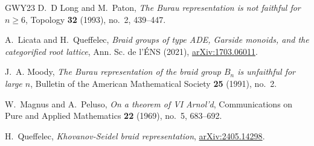 \documentclass[a4paper]{amsart}
\newcommand{\0}{\mathbf{0}}
\theoremstyle{theorem}
\begin{document}
\begin{thebibliography}{GWY23}
D.~D Long and M.~Paton, \emph{The {B}urau representation is not faithful for
  $n\geq 6$}, Topology \textbf{32} (1993), no.~2, 439--447.

A.~Licata and H.~Queffelec, \emph{Braid groups of type {ADE}, {G}arside
  monoids, and the categorified root lattice}, Ann. Sc. de l'{\'E}NS (2021),
  \href{https://arxiv.org/abs/1703.06011}{arXiv:1703.06011}.

J.~A. Moody, \emph{The {B}urau representation of the braid group {$B_n$} is
  unfaithful for large $n$}, Bulletin of the American Mathematical Society
  \textbf{25} (1991), no.~2.

W.~Magnus and A.~Peluso, \emph{On a theorem of {VI} {A}rnol'd}, Communications
  on Pure and Applied Mathematics \textbf{22} (1969), no.~5, 683--692.

H.~Queffelec, \emph{{K}hovanov-{S}eidel braid representation},
  \href{https://arxiv.org/abs/2405.14298}{arXiv:2405.14298}.

\end{thebibliography}
 
\end{document}
